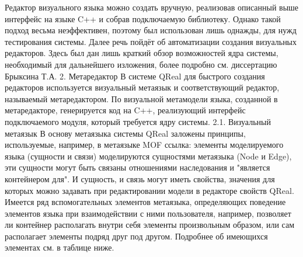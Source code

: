 	Редактор визуального языка можно создать вручную, реализовав описанный выше интерфейс на языке C++ и собрав подключаемую библиотеку. Однако такой подход весьма неэффективен, поэтому был использован лишь однажды, для нужд тестирования системы. Далее речь пойдёт об автоматизации создания визуальных редакторов. Здесь был дан лишь краткий обзор возможностей ядра системы, необходимый для дальнейшего изложения, более подробно см. диссертацию Брыксина Т.А.
2. Метаредактор
	В системе QReal для быстрого создания редакторов используется визуальный метаязык и соответствующий редактор, называемый метаредактором. По визуальной метамодели языка, созданной в метаредакторе, генерируется код на C++, реализующий интерфейс подключаемого модуля, который требуется ядру системы.
2.1. Визуальный метаязык
В основу метаязыка системы QReal заложены принципы, используемые, например, в метаязыке MOF ссылка: элементы моделируемого языка (сущности и связи) моделируются сущностями метаязыка (Node и Edge), эти сущности могут быть связаны отношениями наследования и "является контейнером для". И сущность, и связь могут иметь свойства, значения для которых можно задавать при редактировании модели в редакторе свойств QReal. Имеется ряд вспомогательных элементов метаязыка, определяющих поведение элементов языка при взаимодействии с ними пользователя, например, позволяет ли контейнер располагать внутри себя элементы произвольным образом, или сам располагает элементы подряд друг под другом. Подробнее об имеющихся элементах см. в таблице ниже.

